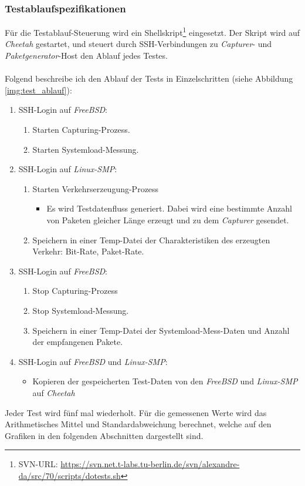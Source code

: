 \subsubsection{Testablaufspezifikationen}
Für die Testablauf-Steuerung wird ein Shellskript\footnote{SVN-URL:
\url{https://svn.net.t-labs.tu-berlin.de/svn/alexandre-da/src/70/scripts/dotests.sh}}
eingesetzt. Der Skript wird auf \emph{Cheetah} gestartet, und steuert durch
SSH-Verbindungen zu \emph{Capturer}- und \emph{Paketgenerator}-Host den Ablauf
jedes Testes.\\\\
Folgend beschreibe ich den Ablauf der Tests in Einzelschritten (siehe Abbildung
\ref{img:test_ablauf}): 
\begin{enumerate}
	\item SSH-Login auf \emph{FreeBSD}:
		\begin{enumerate}
			\item Starten Capturing-Prozess.
			\item Starten Systemload-Messung.
		\end{enumerate}
	\item SSH-Login auf \emph{Linux-SMP}:
		\begin{enumerate}
			\item Starten Verkehrserzeugung-Prozess
				\begin{itemize}
					\item Es wird Testdatenfluss generiert. Dabei wird eine
						bestimmte Anzahl von Paketen gleicher Länge erzeugt und
						zu dem \emph{Capturer} gesendet.
				\end{itemize}
			\item Speichern in einer Temp-Datei der Charakteristiken des
				erzeugten Verkehr: Bit-Rate, Paket-Rate.
		\end{enumerate}
	\item SSH-Login auf \emph{FreeBSD}:
		\begin{enumerate}
			\item Stop Capturing-Prozess
			\item Stop Systemload-Messung.
			\item Speichern in einer Temp-Datei der Systemload-Mess-Daten und
				Anzahl der empfangenen Pakete. 
		\end{enumerate}
	\item SSH-Login auf \emph{FreeBSD} und \emph{Linux-SMP}:
		\begin{itemize}
			\item Kopieren der gespeicherten Test-Daten von den \emph{FreeBSD} und
			\emph{Linux-SMP} auf \emph{Cheetah}
		\end{itemize}
\end{enumerate}
Jeder Test wird fünf mal wiederholt. Für die gemessenen Werte wird das
Arithmetisches Mittel und Standardabweichung berechnet, welche auf den Grafiken
in den folgenden Abschnitten dargestellt sind.


